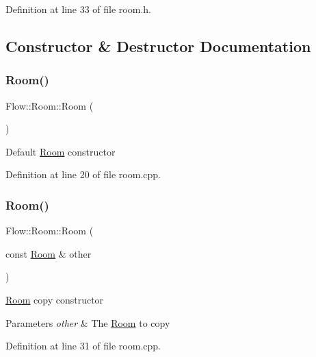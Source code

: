 Definition at line 33 of file room.\+h.



\subsection{Constructor \& Destructor Documentation}
\hypertarget{class_flow_1_1_room_acbd4ea4683660ee3f5120b396e3d9e67}{}\label{class_flow_1_1_room_acbd4ea4683660ee3f5120b396e3d9e67} 
\subsubsection{\texorpdfstring{Room()}{Room()}\hspace{0.1cm}{\footnotesize\ttfamily [1/3]}}
{\footnotesize\ttfamily Flow\+::\+Room\+::\+Room (\begin{DoxyParamCaption}{ }\end{DoxyParamCaption})}

Default \hyperlink{class_flow_1_1_room}{Room} constructor 

Definition at line 20 of file room.\+cpp.

\hypertarget{class_flow_1_1_room_ab9bb4be79ce8b04be3537a6fc308dad4}{}\label{class_flow_1_1_room_ab9bb4be79ce8b04be3537a6fc308dad4} 
\subsubsection{\texorpdfstring{Room()}{Room()}\hspace{0.1cm}{\footnotesize\ttfamily [2/3]}}
{\footnotesize\ttfamily Flow\+::\+Room\+::\+Room (\begin{DoxyParamCaption}\item[{const \hyperlink{class_flow_1_1_room}{Room} \&}]{other }\end{DoxyParamCaption})}

\hyperlink{class_flow_1_1_room}{Room} copy constructor 
\begin{DoxyParams}{Parameters}
{\em other} & The \hyperlink{class_flow_1_1_room}{Room} to copy \\
\hline
\end{DoxyParams}


Definition at line 31 of file room.\+cpp.

\hypertarget{class_flow_1_1_room_ab72d88a0660f8d836fc8edc18ded95dc}{}\label{class_flow_1_1_room_ab72d88a0660f8d836fc8edc18ded95dc} 
